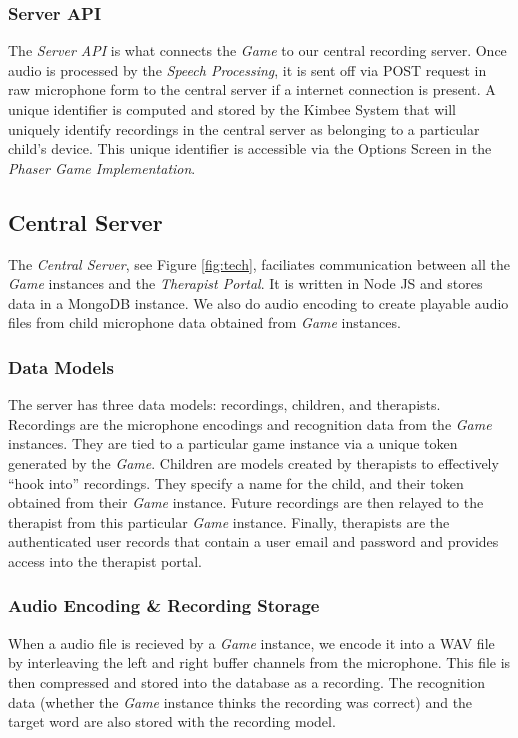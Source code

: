 \documentclass{sig-alternate-2013}
\begin{document}
\subsubsection{Server API}
The {\em Server API} is what connects the {\em Game} to our central recording server. Once audio is processed by the {\em Speech Processing}, it is sent off via POST request in raw microphone form to the central server if a internet connection is present. A unique identifier is computed and stored by the Kimbee System that will uniquely identify recordings in the central server as belonging to a particular child's device. This unique identifier is accessible via the Options Screen in the {\em Phaser Game Implementation}.

\subsection{Central Server}
The {\em Central Server}, see Figure \ref{fig:tech}, faciliates communication between all the {\em Game} instances and the {\em Therapist Portal}. It is written in Node JS and stores data in a MongoDB instance. We also do audio encoding to create playable audio files from child microphone data obtained from {\em Game} instances.

\subsubsection{Data Models}
  The server has three data models: recordings, children, and therapists. Recordings are the microphone encodings and recognition data from the {\em Game} instances. They are tied to a particular game instance via a unique token generated by the {\em Game}. Children are models created by therapists to effectively ``hook into'' recordings. They specify a name for the child, and their token obtained from their {\em Game} instance. Future recordings are then relayed to the therapist from this particular {\em Game} instance. Finally, therapists are the authenticated user records that contain a user email and password and provides access into the therapist portal.

\subsubsection{Audio Encoding \& Recording Storage}
  When a audio file is recieved by a {\em Game} instance, we encode it into a WAV file by interleaving the left and right buffer channels from the microphone. This file is then compressed and stored into the database as a recording. The recognition data (whether the {\em Game} instance thinks the recording was correct) and the target word are also stored with the recording model.
\end{document}
